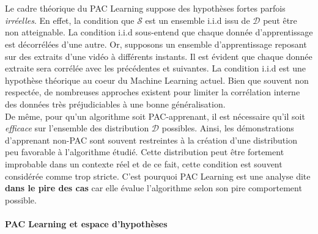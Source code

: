 \\
\\

\noindent Le cadre théorique du PAC Learning suppose des hypothèses fortes parfois \textit{irréelles}. En effet, la condition que $\mathcal{S}$ est un ensemble i.i.d issu de $\mathcal{D}$ peut être non atteignable. La condition i.i.d sous-entend que chaque donnée d'apprentissage est décorrélées d'une autre. Or, supposons un ensemble d'apprentissage reposant sur des extraits d'une vidéo à différents instants. Il est évident que chaque donnée extraite sera corrélée avec les précédentes et suivantes. La condition i.i.d est une hypothèse théorique au coeur du Machine Learning actuel. Bien que souvent non respectée, de nombreuses approches existent pour limiter la corrélation interne des données très préjudiciables à une bonne généralisation.\\

\noindent De même, pour qu'un algorithme soit PAC-apprenant, il est nécessaire qu'il soit \textit{efficace} sur l'ensemble des distribution $\mathcal{D}$ possibles. Ainsi, les démonstrations d'apprenant non-PAC sont souvent restreintes à la création d'une distribution peu favorable à l'algorithme étudié. Cette distribution peut être fortement improbable dans un contexte réel et de ce fait, cette condition est souvent considérée comme trop stricte. C'est pourquoi PAC Learning est une analyse dite \textbf{dans le pire des cas} car elle évalue l'algorithme selon son pire comportement possible.\\

\noindent

\paragraph{PAC Learning et espace d'hypothèses}


